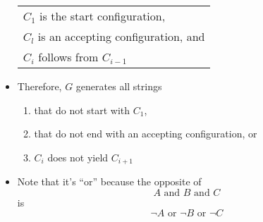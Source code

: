 \begin{frame}[allowframebreaks]
\begin{itemize}
\begin{center}
\begin{tabular}{l}
    $C_1$  is the start configuration,\\
    $C_l$ is an accepting configuration, and\\
    $C_i$ follows from $C_{i-1}$
  \end{tabular}
\end{center}
\item  Therefore, $G$ generates all strings
  \begin{enumerate}
  \item that do not start with $C_1$,
  \item that do not end with an accepting configuration, \alert{or}
  \item $C_i$ does not yield $C_{i+1}$
  \end{enumerate}
\item Note that it's ``or'' because the opposite of
  \begin{equation*}
    A \text{ and } B \text{ and } C
  \end{equation*}
  is
  \begin{equation*}
    \neg A \text{ or } \neg B \text{ or } \neg C
  \end{equation*}


\end{itemize}
\end{frame}
